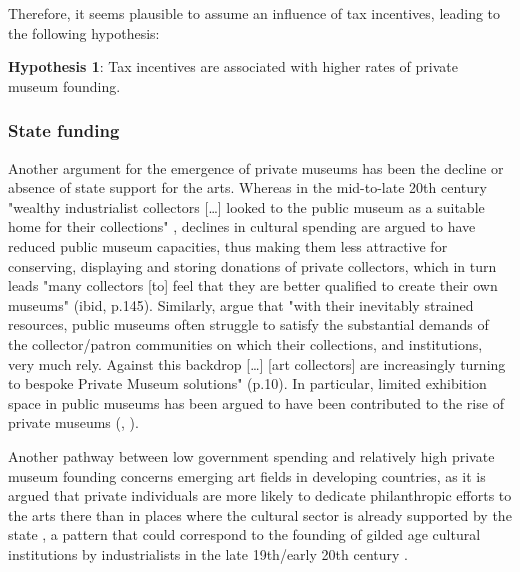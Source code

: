 \documentclass[11pt]{article}
\begin{document}
Therefore, it seems plausible to assume an influence of tax incentives, leading to the following hypothesis:

\bigbreak
\noindent
\textbf{Hypothesis 1}: Tax incentives are associated with higher rates of private museum founding.




\subsubsection*{State funding}






Another argument for the emergence of private museums has been the decline or absence of state support for the arts. 
Whereas in the mid-to-late 20th century "wealthy industrialist collectors [\ldots{}] looked to the public museum as a suitable home for their collections" \parencite[p.144]{Walker_2019_collector}, declines in cultural spending are argued to have reduced public museum capacities, thus making them less attractive for conserving, displaying and storing donations of private collectors, which in turn leads "many collectors [to] feel that they are better qualified to create their own museums" (ibid, p.145).
Similarly, \textcite{Boloten_Hacking_2021_foreword} argue that "with their inevitably strained resources, public museums often struggle to satisfy the substantial demands of the collector/patron communities on which their collections, and institutions, very much rely. Against this backdrop [\ldots{}] [art collectors] are increasingly turning to bespoke Private Museum solutions" (p.10).
In particular, limited exhibition space in public museums has been argued to have been contributed to the rise of private museums (\cite[p.217]{Walker_2019_collector}, \cite[p.1]{Zorloni_Resch_2016_opportunities}). 



Another pathway between low government spending and relatively high private museum founding concerns emerging art fields in developing countries, as it is argued that private individuals are more likely to dedicate philanthropic efforts to the arts there than in places where the cultural sector is already supported by the state \parencite{Durand_2018_jumex,Bechtler_Imhof_2018_future,Boloten_Hacking_2021_foreword}, a pattern that could correspond to the founding of gilded age cultural institutions by industrialists in the late 19th/early 20th century \parencite{diMaggio_1982_boston,Adam_2004_philanthropy}. 
\end{document}

